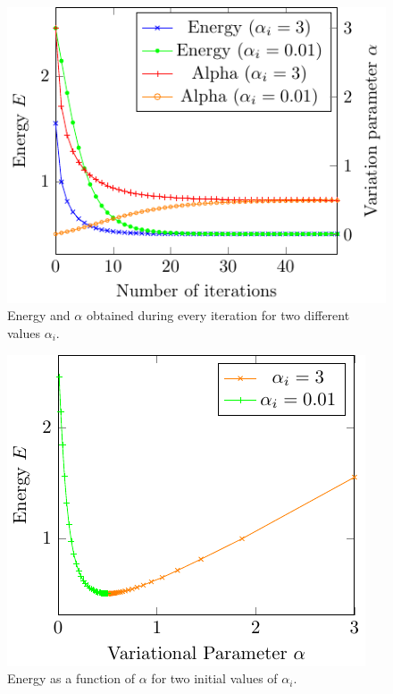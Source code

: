 \begin{figure}
	\begin{center}
		\includegraphics[scale=0.9]{graphs/ho-e-alpha-iterations.pdf}
		\caption{
			Energy and $\alpha$ obtained during every iteration for two different values $\alpha_i$.
			}
		\label{fig:Ho_it}
	\end{center}
\end{figure}
\begin{figure}
	\begin{center}
		\includegraphics[scale=0.9]{graphs/ho-e-alpha.pdf}
		\caption{
			Energy as a function of $\alpha$ for two initial values of $\alpha_i$.
		}
		\label{fig:Ho_rel}
	\end{center}
\end{figure}


